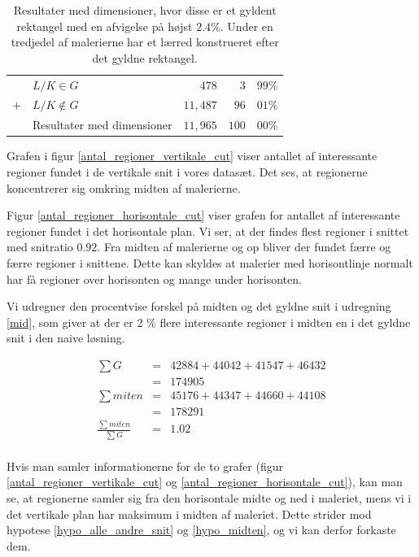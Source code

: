 {\begin{table}[H]
    \centering
    \begin{tabular}{r@{\ \ }p{14em}r|r@{.}l}
            & $L/K \in G$                  &    $478$ &   $3$ & $99\%$ \\
        $+$ & $L/K \notin G$               & $11,487$ &  $96$ & $01\%$ \\\hline
            & Resultater med dimensioner   & $11,965$ & $100$ & $00\%$
    \end{tabular}
    \caption[]{Resultater med dimensioner, hvor disse er et gyldent
    rektangel med en afvigelse på højst $2.4\%$. Under en tredjedel af
    malerierne har et lærred konstrueret efter det gyldne rektangel.}
    \label{tabel_real_dimensions}
\end{table}

Grafen i figur \ref{antal_regioner_vertikale_cut} viser antallet af
interessante regioner fundet i de vertikale snit i vores datasæt. Det
ses, at regionerne koncentrerer sig omkring midten af malerierne.

Figur \ref{antal_regioner_horisontale_cut} viser grafen for antallet af
interessante regioner fundet i det horisontale plan. Vi ser, at der
findes flest regioner i snittet med snitratio $0.92$. Fra midten af
malerierne og op bliver der fundet færre og færre regioner i snittene.
Dette kan skyldes at malerier med horisontlinje normalt har få regioner over
horisonten og mange under horisonten.

Vi udregner den procentvise forskel på midten og det gyldne snit i
udregning \ref{mid}, som giver at der er 2 \% flere interessante
regioner i midten en i det gyldne snit i den naive løsning.
 
\begin{eqnarray}
		\label{Umid}
\sum{G} &=& 42884+44042+41547+46432 \\ \nonumber
			&=& 174905 \\\nonumber
\sum{miten} &=& 45176+44347+44660+44108 \\\nonumber
			&=& 178291 \\\nonumber
\frac{\sum{miten}}{\sum{G}} &=& 1.02  \\ \nonumber	
\end{eqnarray}

Hvis man samler informationerne for de to grafer (figur
\ref{antal_regioner_vertikale_cut} og
\ref{antal_regioner_horisontale_cut}), kan man se, at regionerne samler
sig fra den horisontale midte og ned i maleriet, mens vi i det vertikale
plan har maksimum i midten af maleriet. Dette strider mod hypotese
\ref{hypo_alle_andre_snit} og \ref{hypo_midten}, og vi kan derfor
forkaste dem.

}
